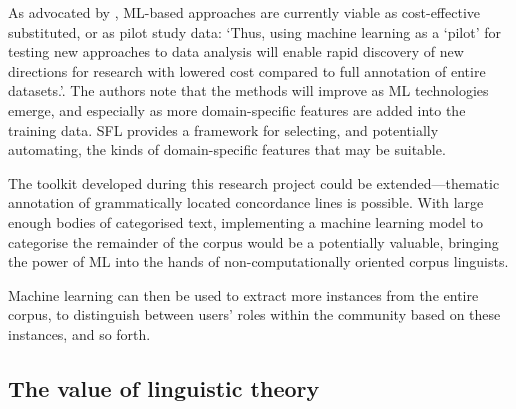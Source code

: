 
As advocated by \textcite[p.~127]{mayfield_automating_2014}, ML-based approaches are currently viable as cost-effective substituted, or as pilot study data: `Thus, using machine learning as a `pilot' for testing new approaches to data analysis will enable rapid discovery of new directions for research with lowered cost compared to full annotation of entire datasets.'. The authors note that the methods will improve as ML technologies emerge, and especially as more domain-specific features are added into the training data. SFL provides a framework for selecting, and potentially automating, the kinds of domain-specific features that may be suitable.

The toolkit developed during this research project could be extended---thematic annotation of grammatically located concordance lines is possible. With large enough bodies of categorised text, implementing a machine learning model to categorise the remainder of the corpus would be a potentially valuable, bringing the power of ML into the hands of non-computationally oriented corpus linguists.

Machine learning can then be used to extract more instances from the entire corpus, to distinguish between users' roles within the community based on these instances, and so forth.




\subsection{The value of linguistic theory} \lipsum




